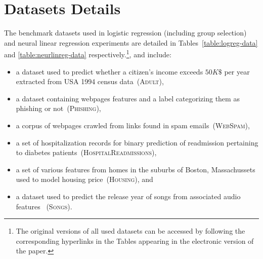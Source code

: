 \section{Datasets Details}
\label{sec:data-details}

The benchmark datasets used in logistic regression (including group selection) and neural linear regression experiments are detailed in Tables~\ref{table:logreg-data} and \ref{table:neurlinreg-data} respectively.\footnote{The original versions of all used datasets can be accessed by following the corresponding hyperlinks in the Tables appearing in the electronic version of the paper.}, and include: 
\begin{itemize}
\item a dataset used to predict whether a citizen's income exceeds $50K \$$ per year extracted from USA 1994 census data~(\textsc{Adult}),
\item a dataset containing webpages features and a label categorizing them as phishing or not~(\textsc{Phishing}),
\item a corpus of webpages crawled from links found in spam emails~(\textsc{WebSpam}),
\item a set of hospitalization records for binary prediction of readmission pertaining to diabetes patients~(\textsc{HospitalReadmissions}),
\item a set of various features from homes in the suburbs of Boston, Massachussets used to model housing price~(\textsc{Housing}), and
\item a dataset used to predict the release year of songs from associated audio features ~(\textsc{Songs}).
\end{itemize} 

